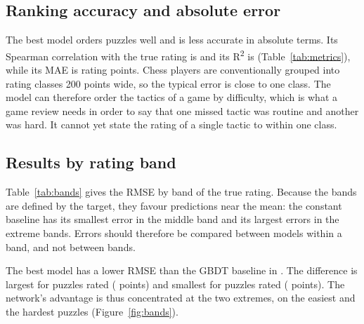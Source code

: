 \documentclass[11pt]{article}
\begin{document}
\subsection{Ranking accuracy and absolute error}

The best model orders puzzles well and is less accurate in absolute terms.
Its Spearman correlation with the true rating is  and its
R\textsuperscript{2} is  (Table~\ref{tab:metrics}), while its MAE is
 rating points. Chess players are conventionally grouped into
rating classes 200 points wide, so the typical error is close to one class.
The model can therefore order the tactics of a game by difficulty, which is
what a game review needs in order to say that one missed tactic was routine
and another was hard. It cannot yet state the rating of a single tactic to
within one class.

\begin{table}[htbp]\centering\small
{}
\caption{All metrics for every model on the test set. RMSE and MAE are in
rating points (lower is better); for R\textsuperscript{2} and Spearman's rank correlation
higher is better. The constant baseline has no rank correlation.}
\label{tab:metrics}
\end{table}

\subsection{Results by rating band}

Table~\ref{tab:bands} gives the RMSE by band of the true rating. Because the
bands are defined by the target, they favour predictions near the mean: the
constant baseline has its smallest error in the middle band and its largest
errors in the extreme bands. Errors should therefore be compared between
models within a band, and not between bands.

\begin{table}[htbp]\centering\small
{}
\caption{Test RMSE by band of the true puzzle rating. The bands are defined
by the target, so values are comparable within a column and not between
columns.}
\label{tab:bands}
\end{table}

The best model has a lower RMSE than the GBDT baseline in
. The difference is largest for puzzles rated
 ( points) and smallest for
puzzles rated  (
points). The network's advantage is thus concentrated at the two extremes, on
the easiest and the hardest puzzles (Figure~\ref{fig:bands}).
\end{document}
